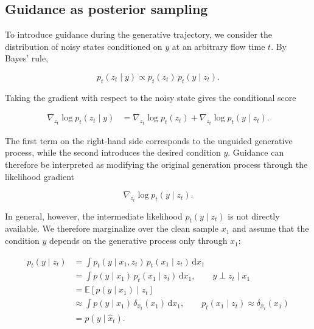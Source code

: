 \subsection{Guidance as posterior sampling}

To introduce guidance during the generative trajectory, we consider the
distribution of noisy states conditioned on $y$ at an arbitrary flow time $t$.
By Bayes' rule,

\begin{equation}
    p_t(z_t\mid y)
    \propto
    p_t(z_t)\,p_t(y\mid z_t).
\end{equation}

Taking the gradient with respect to the noisy state gives the conditional score

\begin{align}
    \nabla_{z_t}\log p_t(z_t\mid y)
    &=
    \nabla_{z_t}\log p_t(z_t)
    +
    \nabla_{z_t}\log p_t(y\mid z_t).
    \label{eq:conditional-score}
\end{align}

The first term on the right-hand side corresponds to the unguided generative process, while the
second introduces the desired condition $y$.
Guidance can therefore be interpreted as modifying the original generation
process through the likelihood gradient

\[
    \nabla_{z_t}\log p_t(y\mid z_t).
\]

In general, however, the intermediate likelihood $p_t(y\mid z_t)$ is not
directly available.
We therefore marginalize over the clean sample $x_1$ and assume that the
condition $y$ depends on the generative process only through $x_1$:

\begin{align}
    p_t(y\mid z_t)
    &=
    \int
    p_t(y\mid x_1,z_t)\,
    p_t(x_1\mid z_t)\,
    \mathrm{d}x_1
    \\
    &=
    \int
    p(y\mid x_1)\,
    p_t(x_1\mid z_t)\,
    \mathrm{d}x_1,
    \qquad
    y \perp z_t \mid x_1
    \\
    &=
    \mathbb{E}
    \left[
        p(y\mid x_1)
        \mid z_t
    \right]
    \\
    &\approx
    \int
    p(y\mid x_1)\,
    \delta_{\hat{x}_t}(x_1)\,
    \mathrm{d}x_1,
    \qquad
    p_t(x_1\mid z_t)
    \approx
    \delta_{\hat{x}_t}(x_1)
    \\
    &=
    p(y\mid\hat{x}_t).
    \label{eq:clean-likelihood-approximation}
\end{align}

